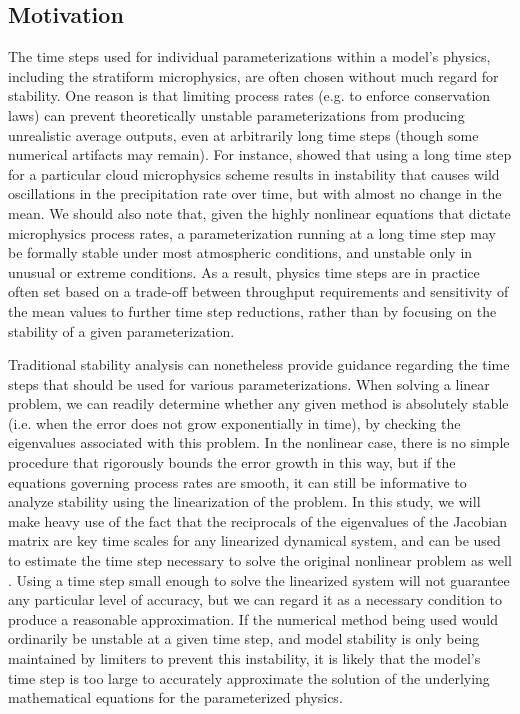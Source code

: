 \documentclass [11pt, proquest] {uwthesis}[2020/02/24]
\begin{document}
\subsection{Motivation}

The time steps used for individual parameterizations within a model's physics, including the stratiform microphysics, are often chosen without much regard for stability. One reason is that limiting process rates (e.g. to enforce conservation laws) can prevent theoretically unstable parameterizations from producing unrealistic average outputs, even at arbitrarily long time steps (though some numerical artifacts may remain). For instance, \textcite{Morrison2008} showed that using a long time step for a particular cloud microphysics scheme results in instability that causes wild oscillations in the precipitation rate over time, but with almost no change in the mean. We should also note that, given the highly nonlinear equations that dictate microphysics process rates, a parameterization running at a long time step may be formally stable under most atmospheric conditions, and unstable only in unusual or extreme conditions. As a result, physics time steps are in practice often set based on a trade-off between throughput requirements and sensitivity of the mean values to further time step reductions, rather than by focusing on the stability of a given parameterization.

Traditional stability analysis can nonetheless provide guidance regarding the time steps that should be used for various parameterizations. When solving a linear problem, we can readily determine whether any given method is absolutely stable (i.e. when the error does not grow exponentially in time), by checking the eigenvalues associated with this problem. In the nonlinear case, there is no simple procedure that rigorously bounds the error growth in this way, but if the equations governing process rates are smooth, it can still be informative to analyze stability using the linearization of the problem. In this study, we will make heavy use of the fact that the reciprocals of the eigenvalues of the Jacobian matrix are key time scales for any linearized dynamical system, and can be used to estimate the time step necessary to solve the original nonlinear problem as well \parencite{RJL-FDM}. Using a time step small enough to solve the linearized system will not guarantee any particular level of accuracy, but we can regard it as a necessary condition to produce a reasonable approximation. If the numerical method being used would ordinarily be unstable at a given time step, and model stability is only being maintained by limiters to prevent this instability, it is likely that the model's time step is too large to accurately approximate the solution of the underlying mathematical equations for the parameterized physics.
\end{document}
